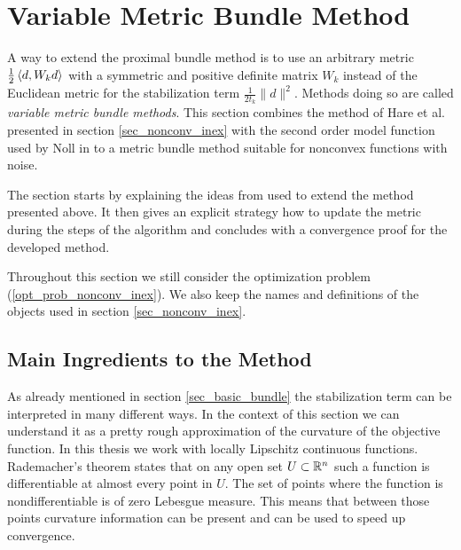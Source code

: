 \section{Variable Metric Bundle Method}
\label{sec_variable_metric}


A way to extend the proximal bundle method is to use an arbitrary metric \(\frac{1}{2}\left\langle d,W_kd \right\rangle\) with a symmetric and positive definite matrix \(W_k\) instead of the Euclidean metric for the stabilization term \(\frac{1}{2t_k}\|d\|^2\). Methods doing so are called \emph{variable metric bundle methods}.
This section combines the method of Hare et al. presented in section \ref{sec_nonconv_inex} with the second order model function used by Noll in \cite{Noll2013} to a metric bundle method suitable for nonconvex functions with noise.

The section starts by explaining the ideas from \cite{Noll2013} used to extend the method presented above. It then gives an explicit strategy how to update the metric during the steps of the algorithm and concludes with a convergence proof for the developed method.

Throughout this section we still consider the optimization problem (\ref{opt_prob_nonconv_inex}). We also keep the names and definitions of the objects used in section \ref{sec_nonconv_inex}.

\subsection{Main Ingredients to the Method}

As already mentioned in section \ref{sec_basic_bundle} the stabilization term can be interpreted in many different ways. In the context of this section we can understand it as a pretty rough approximation of the curvature of the objective function.
In this thesis we work with locally Lipschitz continuous functions. Rademacher's theorem \cite[Theorem 3.1, p. 18]{Heinonen2004} states that on any open set \(U \subset \mathbb{R}^n\) such a function is differentiable at almost every point in \(U\). The set of points where the function is nondifferentiable is of zero Lebesgue measure.
This means that between those points curvature information can be present and can be used to speed up convergence.

